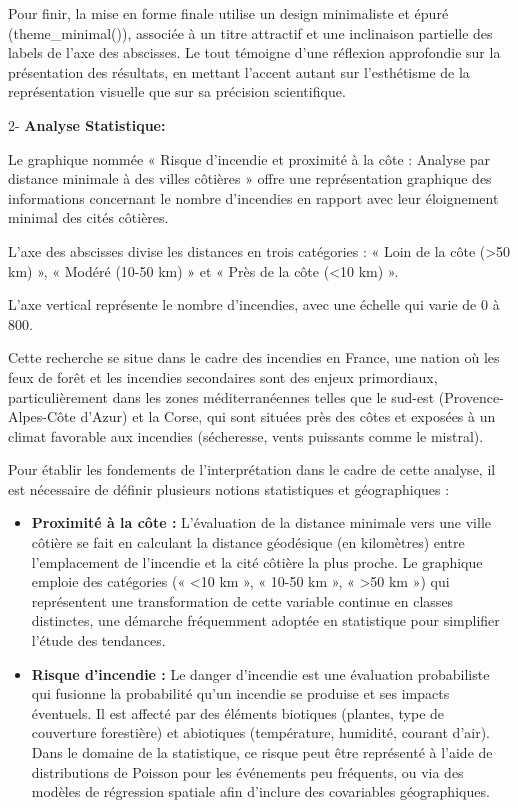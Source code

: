 \documentclass[
]{article}
\begin{document}
Pour finir, la mise en forme finale utilise un design minimaliste et
épuré (theme\_minimal()), associée à un titre attractif et une
inclinaison partielle des labels de l'axe des abscisses. Le tout
témoigne d'une réflexion approfondie sur la présentation des résultats,
en mettant l'accent autant sur l'esthétisme de la représentation
visuelle que sur sa précision scientifique.

2- \textbf{Analyse Statistique:}

Le graphique nommée « Risque d'incendie et proximité à la côte : Analyse
par distance minimale à des villes côtières » offre une représentation
graphique des informations concernant le nombre d'incendies en rapport
avec leur éloignement minimal des cités côtières.

L'axe des abscisses divise les distances en trois catégories : « Loin de
la côte (\textgreater50 km) », « Modéré (10-50 km) » et « Près de la
côte (\textless10 km) ».

L'axe vertical représente le nombre d'incendies, avec une échelle qui
varie de 0 à 800.

Cette recherche se situe dans le cadre des incendies en France, une
nation où les feux de forêt et les incendies secondaires sont des enjeux
primordiaux, particulièrement dans les zones méditerranéennes telles que
le sud-est (Provence-Alpes-Côte d'Azur) et la Corse, qui sont situées
près des côtes et exposées à un climat favorable aux incendies
(sécheresse, vents puissants comme le mistral).

Pour établir les fondements de l'interprétation dans le cadre de cette
analyse, il est nécessaire de définir plusieurs notions statistiques et
géographiques :

\begin{itemize}
\item
  \textbf{Proximité à la côte :} L'évaluation de la distance minimale
  vers une ville côtière se fait en calculant la distance géodésique (en
  kilomètres) entre l'emplacement de l'incendie et la cité côtière la
  plus proche. Le graphique emploie des catégories (« \textless10 km »,
  « 10-50 km », « \textgreater50 km ») qui représentent une
  transformation de cette variable continue en classes distinctes, une
  démarche fréquemment adoptée en statistique pour simplifier l'étude
  des tendances.
\item
  \textbf{Risque d'incendie :} Le danger d'incendie est une évaluation
  probabiliste qui fusionne la probabilité qu'un incendie se produise et
  ses impacts éventuels. Il est affecté par des éléments biotiques
  (plantes, type de couverture forestière) et abiotiques (température,
  humidité, courant d'air). Dans le domaine de la statistique, ce risque
  peut être représenté à l'aide de distributions de Poisson pour les
  événements peu fréquents, ou via des modèles de régression spatiale
  afin d'inclure des covariables géographiques.
\end{itemize}
\end{document}
